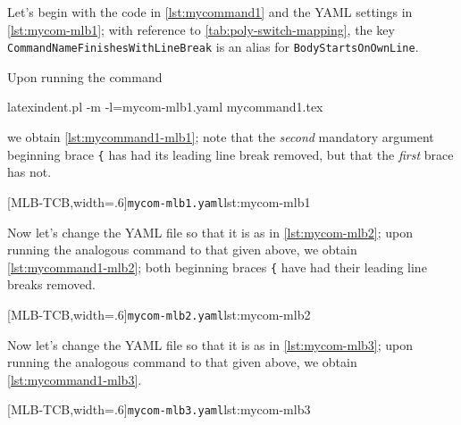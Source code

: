 	Let's begin with the code in \cref{lst:mycommand1} and the YAML settings in
	\cref{lst:mycom-mlb1}; with reference to \vref{tab:poly-switch-mapping}, the key
	\texttt{CommandNameFinishesWithLineBreak} is an alias for \texttt{BodyStartsOnOwnLine}.


	Upon running the command
	\begin{commandshell}
latexindent.pl -m -l=mycom-mlb1.yaml mycommand1.tex
\end{commandshell}
	we obtain \cref{lst:mycommand1-mlb1}; note that the \emph{second} mandatory argument
	beginning brace \lstinline!{! has had its leading line break removed, but that the
	\emph{first} brace has not.

	\begin{cmhtcbraster}[
			raster force size=false,
			raster column 1/.style={add to width=-1cm},
		]
		[MLB-TCB,width=.6\textwidth]{\texttt{mycom-mlb1.yaml}}{lst:mycom-mlb1}
	\end{cmhtcbraster}

	Now let's change the YAML file so that it is as in \cref{lst:mycom-mlb2}; upon running
	the analogous command to that given above, we obtain \cref{lst:mycommand1-mlb2}; both
	beginning braces \lstinline!{! have had their leading line breaks removed.

	\begin{cmhtcbraster}[
			raster force size=false,
			raster column 1/.style={add to width=-1cm},
		]
		[MLB-TCB,width=.6\textwidth]{\texttt{mycom-mlb2.yaml}}{lst:mycom-mlb2}
	\end{cmhtcbraster}

	Now let's change the YAML file so that it is as in \cref{lst:mycom-mlb3}; upon running
	the analogous command to that given above, we obtain \cref{lst:mycommand1-mlb3}.

	\begin{cmhtcbraster}[
			raster force size=false,
			raster column 1/.style={add to width=-1cm},
		]
		[MLB-TCB,width=.6\textwidth]{\texttt{mycom-mlb3.yaml}}{lst:mycom-mlb3}
	\end{cmhtcbraster}

